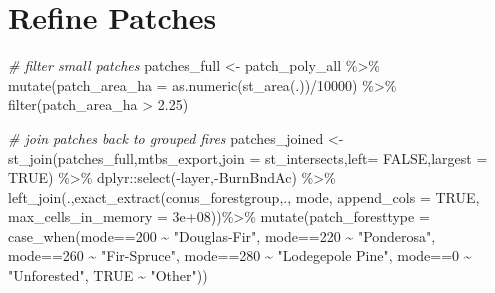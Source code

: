 \documentclass[
]{book}
\newenvironment{Shaded}{\begin{snugshade}}{\end{snugshade}}
\newcommand{\AttributeTok}[1]{\textcolor[rgb]{0.77,0.63,0.00}{#1}}
\newcommand{\CommentTok}[1]{\textcolor[rgb]{0.56,0.35,0.01}{\textit{#1}}}
\newcommand{\ConstantTok}[1]{\textcolor[rgb]{0.00,0.00,0.00}{#1}}
\newcommand{\DecValTok}[1]{\textcolor[rgb]{0.00,0.00,0.81}{#1}}
\newcommand{\FloatTok}[1]{\textcolor[rgb]{0.00,0.00,0.81}{#1}}
\newcommand{\FunctionTok}[1]{\textcolor[rgb]{0.00,0.00,0.00}{#1}}
\newcommand{\NormalTok}[1]{#1}
\newcommand{\OtherTok}[1]{\textcolor[rgb]{0.56,0.35,0.01}{#1}}
\newcommand{\SpecialCharTok}[1]{\textcolor[rgb]{0.00,0.00,0.00}{#1}}
\newcommand{\StringTok}[1]{\textcolor[rgb]{0.31,0.60,0.02}{#1}}
\begin{document}
\hypertarget{refine-patches}{%
\section{Refine Patches}\label{refine-patches}}

\begin{Shaded}
\begin{Highlighting}[]
\CommentTok{\# filter small patches}
\NormalTok{patches\_full }\OtherTok{\textless{}{-}}\NormalTok{ patch\_poly\_all }\SpecialCharTok{\%\textgreater{}\%} 
  \FunctionTok{mutate}\NormalTok{(}\AttributeTok{patch\_area\_ha =} \FunctionTok{as.numeric}\NormalTok{(}\FunctionTok{st\_area}\NormalTok{(.))}\SpecialCharTok{/}\DecValTok{10000}\NormalTok{) }\SpecialCharTok{\%\textgreater{}\%}
  \FunctionTok{filter}\NormalTok{(patch\_area\_ha }\SpecialCharTok{\textgreater{}} \FloatTok{2.25}\NormalTok{)}
\end{Highlighting}
\end{Shaded}

\begin{Shaded}
\begin{Highlighting}[]
\CommentTok{\# join patches back to grouped fires}
\NormalTok{patches\_joined }\OtherTok{\textless{}{-}} \FunctionTok{st\_join}\NormalTok{(patches\_full,mtbs\_export,}\AttributeTok{join =}\NormalTok{ st\_intersects,}\AttributeTok{left=} \ConstantTok{FALSE}\NormalTok{,}\AttributeTok{largest =} \ConstantTok{TRUE}\NormalTok{) }\SpecialCharTok{\%\textgreater{}\%}
\NormalTok{  dplyr}\SpecialCharTok{::}\FunctionTok{select}\NormalTok{(}\SpecialCharTok{{-}}\NormalTok{layer,}\SpecialCharTok{{-}}\NormalTok{BurnBndAc) }\SpecialCharTok{\%\textgreater{}\%} 
  \FunctionTok{left\_join}\NormalTok{(.,}\FunctionTok{exact\_extract}\NormalTok{(conus\_forestgroup,., }\StringTok{\textquotesingle{}mode\textquotesingle{}}\NormalTok{, }\AttributeTok{append\_cols =} \ConstantTok{TRUE}\NormalTok{, }\AttributeTok{max\_cells\_in\_memory =} \FloatTok{3e+08}\NormalTok{))}\SpecialCharTok{\%\textgreater{}\%}
  \FunctionTok{mutate}\NormalTok{(}\AttributeTok{patch\_foresttype =} \FunctionTok{case\_when}\NormalTok{(mode}\SpecialCharTok{==}\DecValTok{200} \SpecialCharTok{\textasciitilde{}} \StringTok{"Douglas{-}Fir"}\NormalTok{,}
\NormalTok{                                     mode}\SpecialCharTok{==}\DecValTok{220} \SpecialCharTok{\textasciitilde{}} \StringTok{"Ponderosa"}\NormalTok{,}
\NormalTok{                                     mode}\SpecialCharTok{==}\DecValTok{260} \SpecialCharTok{\textasciitilde{}} \StringTok{"Fir{-}Spruce"}\NormalTok{,}
\NormalTok{                                     mode}\SpecialCharTok{==}\DecValTok{280} \SpecialCharTok{\textasciitilde{}} \StringTok{"Lodegepole Pine"}\NormalTok{,}
\NormalTok{                                     mode}\SpecialCharTok{==}\DecValTok{0} \SpecialCharTok{\textasciitilde{}} \StringTok{"Unforested"}\NormalTok{,}
                                     \ConstantTok{TRUE} \SpecialCharTok{\textasciitilde{}} \StringTok{"Other"}\NormalTok{))}
\end{Highlighting}
\end{Shaded}
\end{document}
